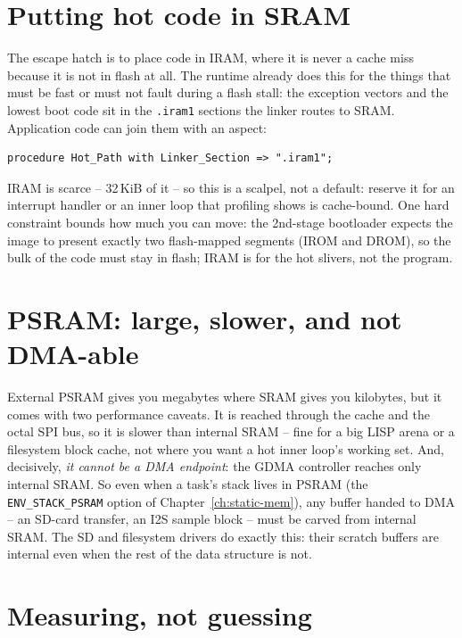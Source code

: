 \section{Putting hot code in SRAM}

The escape hatch is to place code in IRAM, where it is never a cache miss because it
is not in flash at all. The runtime already does this for the things that must be
fast or must not fault during a flash stall: the exception vectors and the lowest
boot code sit in the \texttt{.iram1} sections the linker routes to SRAM. Application
code can join them with an aspect:

\begin{lstlisting}
procedure Hot_Path with Linker_Section => ".iram1";
\end{lstlisting}

IRAM is scarce -- 32\,KiB of it -- so this is a scalpel, not a default: reserve it
for an interrupt handler or an inner loop that profiling shows is cache-bound. One
hard constraint bounds how much you can move: the 2nd-stage bootloader expects the
image to present exactly two flash-mapped segments (IROM and DROM), so the bulk of
the code must stay in flash; IRAM is for the hot slivers, not the program.

\section{PSRAM: large, slower, and not DMA-able}

External PSRAM gives you megabytes where SRAM gives you kilobytes, but it comes with
two performance caveats. It is reached through the cache and the octal SPI bus, so it
is slower than internal SRAM -- fine for a big LISP arena or a filesystem block
cache, not where you want a hot inner loop's working set. And, decisively, \emph{it
cannot be a DMA endpoint}: the GDMA controller reaches only internal SRAM. So even
when a task's stack lives in PSRAM (the \texttt{ENV\_STACK\_PSRAM} option of
Chapter~\ref{ch:static-mem}), any buffer handed to DMA -- an SD-card transfer, an
I2S sample block -- must be carved from internal SRAM. The SD and filesystem drivers
do exactly this: their scratch buffers are internal even when the rest of the data
structure is not.

\section{Measuring, not guessing}

